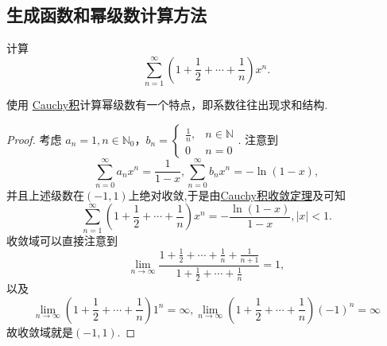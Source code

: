 \documentclass[../../main.tex]{subfiles}%
\begin{document}
\subsection{生成函数和幂级数计算方法}

\begin{example}\label{example:例题11.24556415}
计算
\[
\sum_{n=1}^{\infty} \left(1 + \frac{1}{2} + \cdots + \frac{1}{n}\right) x^n.
\]
\end{example}
\begin{note}
使用 \hyperref[definition:Cauchy积]{Cauchy积}计算幂级数有一个特点，即系数往往出现求和结构.
\end{note}
\begin{proof}

考虑 \(a_n = 1, n \in \mathbb{N}_0\)，\(b_n = \begin{cases} \frac{1}{n}, & n \in \mathbb{N} \\ 0 & n = 0 \end{cases}\). 注意到
\[
\sum_{n=0}^{\infty} a_n x^n = \frac{1}{1 - x}, \sum_{n=0}^{\infty} b_n x^n = -\ln (1 - x),
\]
并且上述级数在$(-1,1)$上绝对收敛,于是由\hyperref[theorem:Cauchy积收敛定理]{Cauchy积收敛定理}及可知
\[
\sum_{n=1}^{\infty} \left(1 + \frac{1}{2} + \cdots + \frac{1}{n}\right) x^n = -\frac{\ln (1 - x)}{1 - x}, |x| < 1.
\]
收敛域可以直接注意到
\[
\lim_{n \to \infty} \frac{1 + \frac{1}{2} + \cdots + \frac{1}{n} + \frac{1}{n + 1}}{1 + \frac{1}{2} + \cdots + \frac{1}{n}} = 1,
\]
以及
\[
\lim_{n \to \infty} \left(1 + \frac{1}{2} + \cdots + \frac{1}{n}\right) 1^n = \infty, \lim_{n \to \infty} \left(1 + \frac{1}{2} + \cdots + \frac{1}{n}\right) (-1)^n = \infty
\]
故收敛域就是$(-1,1)$.

\end{proof}
\end{document}
